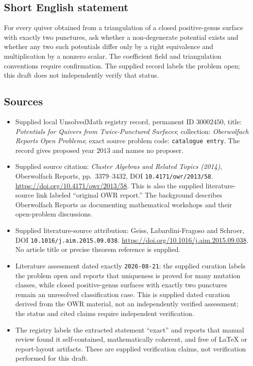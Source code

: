 \documentclass[11pt]{article}
\begin{document}
\subsection{Short English statement}
For every quiver obtained from a triangulation of a closed positive-genus surface with exactly two punctures, ask whether a non-degenerate potential exists and whether any two such potentials differ only by a right equivalence and multiplication by a nonzero scalar. The coefficient field and triangulation conventions require confirmation. The supplied record labels the problem open; this draft does not independently verify that status.
\subsection{Sources}
\begin{itemize}
\item Supplied local UnsolvedMath registry record, permanent ID \(30002450\), title: \emph{Potentials for Quivers from Twice-Punctured Surfaces}; collection: \emph{Oberwolfach Reports Open Problems}; exact source problem code: \texttt{catalogue entry}. The record gives proposed year \(2013\) and names no proposer.
\item Supplied source citation: \emph{Cluster Algebras and Related Topics (2014)}, Oberwolfach Reports, pp.~3379--3432, DOI \texttt{10.4171/owr/2013/58}. \url{https://doi.org/10.4171/owr/2013/58}. This is also the supplied literature-source link labeled ``original OWR report.'' The background describes Oberwolfach Reports as documenting mathematical workshops and their open-problem discussions.
\item Supplied literature-source attribution: Geiss, Labardini-Fragoso and Schroer, DOI \texttt{10.1016/j.aim.2015.09.038}. \url{https://doi.org/10.1016/j.aim.2015.09.038}. No article title or precise theorem reference is supplied.
\item Literature assessment dated exactly \texttt{2026-08-21}: the supplied curation labels the problem open and reports that uniqueness is proved for many mutation classes, while closed positive-genus surfaces with exactly two punctures remain an unresolved classification case. This is supplied dated curation derived from the OWR material, not an independently verified assessment; the status and cited claims require independent verification.
\item The registry labels the extracted statement ``exact'' and reports that manual review found it self-contained, mathematically coherent, and free of LaTeX or report-layout artifacts. These are supplied verification claims, not verification performed for this draft.
\end{itemize}
\end{document}
